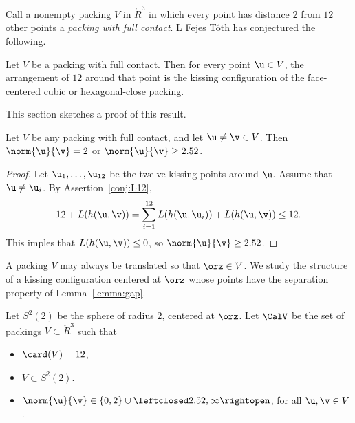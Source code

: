 Call a nonempty packing $ V$ in $\ring{R}^3$ in which every point has
distance $2$ from $12$ other points a {\it packing with full
  contact}. L Fejes T\'oth has conjectured the following.
%
%
%


\begin{theorem}\label{thm:fc} 
Let $ V$ be a packing with full
  contact.  Then for every point $ \u\in V$, the arrangement of $12$
  around that point is the kissing configuration of the face-centered
  cubic or hexagonal-close packing.
\end{theorem}
%
%
%

This section  sketches a proof of this result.  


\begin{lemma}[] \label{lemma:gap}
Let $V$ be any packing with full contact, and let $\u\ne\v\in V$.
Then $\norm{\u}{\v}=2$ or $\norm{\u}{\v} \ge 2.52$.
\end{lemma}
%
%

\begin{proof} Let $ \u_1,\ldots, \u_{12}$ be the twelve kissing
  points around $\u$.   Assume that $\u\ne \u_i$.  By Assertion~\ref{conj:L12}, 
\begin{displaymath}
  12 + L(h( \u, \v)) 
= \sum_{i=1}^{12} L(h( \u, \u_i)) + L(h( \u, \v)) \le 12.
\end{displaymath}
This imples that $L(h( \u, \v))\le 0$, so $\norm{ \u}{ \v}\ge 2.52$.
\end{proof}

A packing $V$ may always be translated so that $\orz\in V$.   We study the structure
of a kissing configuration centered at $\orz$ whose points have the 
separation property of Lemma~\ref{lemma:gap}.

\begin{definition}[$S^2(2)$,~$\CalV$]
Let $S^2(2)$ be the sphere of radius $2$, centered at $\orz$.
Let $\CalV$ be the set of packings $V\subset \ring{R}^3$ such that
\begin{itemize}
\item $\card(V) = 12$,
\item $V\subset S^2(2)$.
\item $\norm{\u}{\v} \in \{0,2\}\cup \leftclosed2.52,\infty\rightopen$, for all $\u,\v\in V$.
\end{itemize}
%
%
\end{definition}


